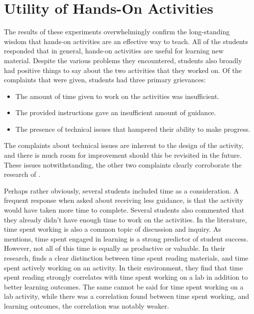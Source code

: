 \section{Utility of Hands-On Activities}
    The results of these experiments overwhelmingly confirm the long-standing wisdom that hands-on activities are an effective way to teach. 
    All of the students responded that in general, hands-on activities are useful for learning new material. 
    Despite the various problems they encountered, students also broadly had positive things to say about the two activities that they worked on. 
    Of the complaints that were given, students had three primary grievances:
    \begin{itemize}
        \item The amount of time given to work on the activities was insufficient.
        \item The provided instructions gave an insufficient amount of guidance.
        \item The presence of technical issues that hampered their ability to make progress.
    \end{itemize}
    The complaints about technical issues are inherent to the design of the activity, and there is much room for improvement should this be revisited in the future. 
    These issues notwithstanding, the other two complaints clearly corroborate the research of \citeauthor{J-Sweller}. 
    
    Perhaps rather obviously, several students included time as a consideration. 
    A frequent response when asked about receiving less guidance, is that the activity would have taken more time to complete. 
    Several students also commented that they already didn't have enough time to work on the activities. 
    In the literature, time spent working is also a common topic of discussion and inquiry. 
    As \textcite{C-Linehan} mentions, time spent engaged in learning is a strong predictor of student success. 
    However, not all of this time is equally as productive or valuable. 
    In their research, \textcite{Z-Zeng} finds a clear distinction between time spent reading materials, and time spent actively working on an activity. 
    In their environment, they find that time spent reading strongly correlates with time spent working on a lab in addition to better learning outcomes. 
    The same cannot be said for time spent working on a lab activity, while there was a correlation found between time spent working, and learning outcomes, the correlation was notably weaker. 
    
